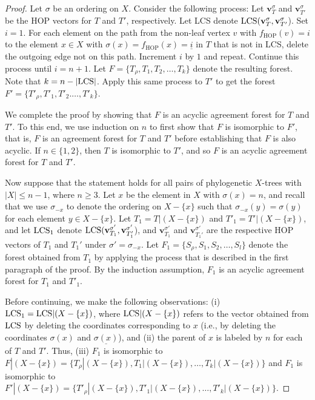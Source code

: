 \documentclass{article}
\newcommand{\HOP}{\mathrm{HOP}}
\newcommand{\ul}{\underline}
\begin{document}
\begin{proof}
Let $\sigma$ be an ordering on $X$.
Consider the following process: {Let $\mathbf{v}_T^\sigma$ and $\mathbf{v}_{T'}^\sigma$ be the HOP vectors for $T$ and $T'$, respectively. Let LCS denote ${\rm LCS}(\mathbf{v}_T^\sigma, \mathbf{v}_{T'}^\sigma$).} 
Set $i=1$. For each element on the path from {the non-leaf vertex $v$ with $f_\HOP(v)=i$} to {the element $x \in X$ with $\sigma(x)=f_\HOP(x)=\ul{i}$} in $T$ that is not in LCS, delete the outgoing edge not on this path. Increment $i$ by $1$ and repeat. Continue this process until $i=n+1$. Let $F=\{T_{\rho}, T_1, T_2, \ldots, T_k\}$ denote the resulting forest. Note that $k=n-|{\rm LCS}|$. Apply this same process to $T'$ to get the forest $F'=\{T'_{\rho}, T'_1, T'_2. \ldots, T'_k\}$.

We complete the proof by showing that $F$ is an acyclic agreement forest for $T$ and $T'$. To this end, we use induction on $n$ to first show that $F$ is isomorphic to $F'$, that is, $F$ is an agreement forest for $T$ and $T'$ before establishing that $F$ is also acyclic. If $n\in \{1, 2\}$, then $T$ is isomorphic to $T'$, and so $F$ is an acyclic agreement forest for $T$ and $T'$. 

Now suppose that the statement holds for all pairs of phylogenetic $X$-trees with $|X| \leq n-1$, where $n\ge 3$. Let $x$ be the element in $X$ with $\sigma(x)=n$, 
and recall that we use $\sigma_{-x}$ to denote the ordering on $X - \{x\}$ such that $\sigma_{-x}(y) = \sigma(y)$ for each element $y \in X - \{x\}$.
Let $T_1 = T|(X - \{x\})$ and $T'_1 = T'|(X - \{x\})$, {and let ${\rm LCS}_1$ denote ${\rm LCS} (\mathbf{v}_{T_1}^{\sigma'}, \mathbf{v}_{T_1'}^{\sigma'}$)}, and $\mathbf{v}_{T_1}^{\sigma'}$ and $\mathbf{v}_{T_1'}^{\sigma'}$ are the respective HOP vectors of $T_1$ and $T_1'$ under $\sigma'=\sigma_{-x}$. Let $F_1=\{S_{\rho}, S_1, S_2, \ldots, S_l\}$ denote the forest obtained from $T_1$ by applying the process that is described in the first paragraph of the proof. By the induction assumption, $F_1$ is an acyclic agreement forest for $T_1$ and $T'_1$.

Before continuing, we make the following observations: (i) ${\rm LCS}_1={\rm LCS}|(X - \{x\})$, where ${\rm LCS}|(X - \{x\})$ refers to the vector obtained from ${\rm LCS}$ by deleting the coordinates corresponding to $x$ (i.e., by deleting the coordinates $\sigma(x)$ and $\ul{\sigma(x)}$), and (ii) the parent of $x$ is labeled by $n$ for each of $T$ and $T'$. Thus, (iii) $F_1$ is isomorphic to $F|(X - \{x\})=\{T_\rho| (X - \{x\}), T_1| (X - \{x\}), \ldots, T_k| (X - \{x\}) \}$ and $F_1$ is isomorphic to $F'|(X- \{x\})=\{T'_\rho| (X - \{x\}), T'_1| (X - \{x\}), \ldots, T'_k| (X - \{x\}) \}$. 


\end{proof}
\end{document}
